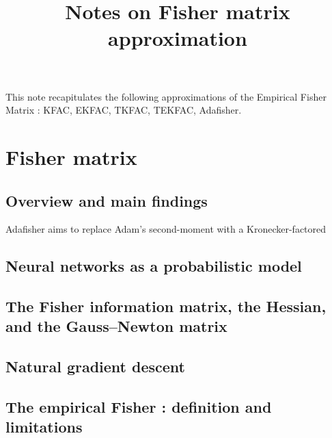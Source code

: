\documentclass[11pt]{report}
\title{\sffamily\bfseries Notes on Fisher matrix approximation}
\author{}
\date{}
\numberwithin{equation}{chapter}
\theoremstyle{plain}
\theoremstyle{remark}
\begin{document}
\hypersetup{pageanchor=false}
\maketitle
\hypersetup{pageanchor=true}
\thispagestyle{empty}

\noindent This note recapitulates the following approximations of the Empirical Fisher Matrix : KFAC, EKFAC, TKFAC, TEKFAC, Adafisher.
\tableofcontents
{}

\chapter{Fisher matrix}

\section{Overview and main findings}

Adafisher aims to replace Adam's second-moment with a Kronecker-factored

\section{Neural networks as a probabilistic model}
\mbox{}\par

\section{The Fisher information matrix, the Hessian, and the Gauss--Newton matrix}
\mbox{}\par

\section{Natural gradient descent}
\mbox{}\par

\section{The empirical Fisher : definition and limitations}
\mbox{}\par
\end{document}
